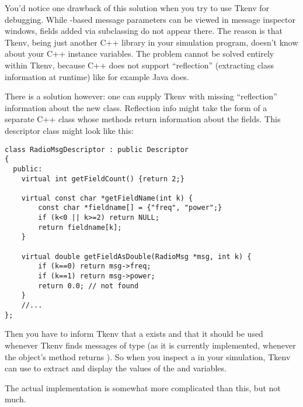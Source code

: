 You'd notice one drawback of this solution when you try to use
Tkenv for debugging. While -based message parameters can be viewed in
message inspector windows, fields added via subclassing do not appear
there. The reason is that Tkenv, being just another C++ library in your
simulation program, doesn't know about your C++ instance variables.
The problem cannot be solved entirely within Tkenv, because C++ does not
support ``reflection'' (extracting class information at runtime)
like for example Java does.

There is a solution however: one can supply Tkenv with missing ``reflection''
information about the new class. Reflection info might take the form of
a separate C++ class whose methods return information about the
 fields. This descriptor class might look like this:

\begin{verbatim}
class RadioMsgDescriptor : public Descriptor
{
  public:
    virtual int getFieldCount() {return 2;}

    virtual const char *getFieldName(int k) {
        const char *fieldname[] = {"freq", "power";}
        if (k<0 || k>=2) return NULL;
        return fieldname[k];
    }

    virtual double getFieldAsDouble(RadioMsg *msg, int k) {
        if (k==0) return msg->freq;
        if (k==1) return msg->power;
        return 0.0; // not found
    }
    //...
};
\end{verbatim}

Then you have to inform Tkenv that a  exists and that it
should be used whenever Tkenv finds messages of type  (as it is
currently implemented, whenever the object's  method returns
). So when you inspect a  in your simulation, Tkenv
can use  to extract and display the values of
the  and  variables.

The actual implementation is somewhat more complicated than this, but not
much.

